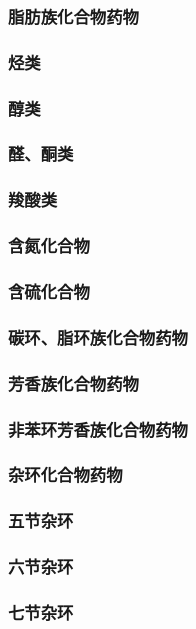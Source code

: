 \documentclass[UTF8]{../../ApplicationUniverse}
\begin{document}
    \subsubsection{脂肪族化合物药物}
        \subsubsection{烃类}
        \subsubsection{醇类}
        \subsubsection{醛、酮类}
        \subsubsection{羧酸类}
        \subsubsection{含氮化合物}
        \subsubsection{含硫化合物}
    \subsubsection{碳环、脂环族化合物药物}
    \subsubsection{芳香族化合物药物}
        \subsubsection{非苯环芳香族化合物药物}
    \subsubsection{杂环化合物药物}
        \subsubsection{五节杂环}
        \subsubsection{六节杂环}
        \subsubsection{七节杂环}
\end{document}
